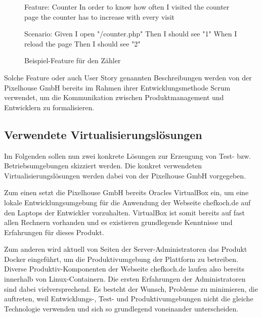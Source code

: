 \begin{figure}[!ht]
  \begin{center}
    \begin{gherkincode}
Feature: Counter
  In order to know how often I visited the counter page
  the counter has to increase with every visit

  Scenario:
    Given I open "/counter.php"
    Then I should see "1"
    When I reload the page
    Then I should see "2"

    \end{gherkincode}
    \caption{Beispiel-Feature für den Zähler}
  \end{center}
\end{figure}

Solche Feature oder auch User Story genannten Beschreibungen werden von der Pixelhouse GmbH bereits im Rahmen ihrer Entwicklungsmethode Scrum verwendet, um die Kommunikation zwischen Produktmanagement und Entwicklern zu formalisieren.

\subsection{Verwendete Virtualisierungslösungen}

Im Folgenden sollen nun zwei konkrete Lösungen zur Erzeugung von Test- bzw. Betriebsumgebungen skizziert werden. Die konkret verwendeten Virtualisierungslösungen werden dabei von der Pixelhouse GmbH vorgegeben.

Zum einen setzt die Pixelhouse GmbH bereits Oracles VirtualBox ein, um eine lokale Entwicklungsumgebung für die Anwendung der Webseite chefkoch.de auf den Laptops der Entwickler vorzuhalten. VirtualBox ist somit bereits auf fast allen Rechnern vorhanden und es existieren grundlegende Kenntnisse und Erfahrungen für dieses Produkt.

Zum anderen wird aktuell von Seiten der Server-Administratoren das Produkt Docker eingeführt, um die Produktivumgebung der Plattform zu betreiben. Diverse Produktiv-Komponenten der Webseite chefkoch.de laufen also bereits innerhalb von Linux-Containern. Die ersten Erfahrungen der Administratoren sind dabei vielversprechend. Es besteht der Wunsch, Probleme zu minimieren, die auftreten, weil Entwicklungs-, Test- und Produktivumgebungen nicht die gleiche Technologie verwenden und sich so grundlegend voneinander unterscheiden.
